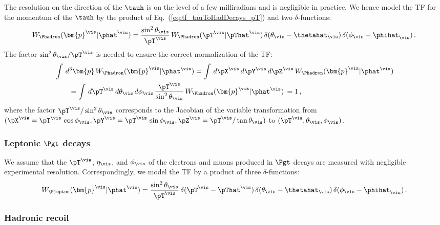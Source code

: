 The resolution on the direction of the $\tauh$ is on the level
of a few milliradians and is negligible in practice.
We hence model the TF for the momentum of the $\tauh$ by the product of Eq.~(\ref{eq:tf_tauToHadDecays_pT}) and two
$\delta$-functions:
\begin{equation}
W_{\Phadron}( \bm{p}^{\vis} | \phat^{\vis} ) =
 \frac{\sin^{2}\theta_{\vis}}{\pT^{\vis}} \, 
  W_{\Phadron}( \pT^{\vis} | \pThat^{\vis} ) \,
  \delta( \theta_{\vis} - \thetahat_{\vis} ) \, 
  \delta( \phi_{\vis} - \phihat_{\vis} ) \, .
\label{eq:tf_tauToHadDecays}
\end{equation}
The factor $\sin^{2}\theta_{\vis}/\pT^{\vis}$ is needed
to ensure the correct normalization of the TF:
\begin{align}
& \int \, d^{3}\bm{p}  \, W_{\Phadron}( \bm{p}^{\vis} | \phat^{\vis} ) = \int \, d\pX^{\vis} \, d\pY^{\vis} \, d\pZ^{\vis} \, W_{\Phadron}( \bm{p}^{\vis} | \phat^{\vis} ) \nonumber \\
& \qquad = \int \, d\pT^{\vis} \, d\theta_{\vis} \, d\phi_{\vis} \,
\frac{\pT^{\vis}}{\sin^{2} \theta_{\vis}} \, W_{\Phadron}( \bm{p}^{\vis} | \phat^{\vis} ) \, 
  = 1 \, ,
\end{align}
where the factor $\pT^{\vis}/\sin^{2} \theta_{\vis}$ corresponds to the Jacobian of the variable transformation 
from $(\pX^{\vis} = \pT^{\vis} \, \cos\phi_{\vis}, \pY^{\vis} = \pT^{\vis} \, \sin\phi_{\vis}, \pZ^{\vis} = \pT^{\vis}/\tan\theta_{\vis})$ 
to $(\pT^{\vis}, \theta_{\vis}, \phi_{\vis})$.


\subsubsection{Leptonic $\Pgt$ decays}
\label{sec:mem_TF_tauToLepDecays}

We assume that the $\pT^{\vis}$, $\eta_{\vis}$, and $\phi_{\vis}$
of the electrons and muons produced in $\Pgt$ decays are measured with negligible experimental resolution.
Correspondingly, we model the TF by a product of three $\delta$-functions:
\begin{equation}
W_{\Plepton}( \bm{p}^{\vis} | \phat^{\vis} ) =  
 \frac{\sin^{2} \theta_{\vis}}{\pT^{\vis}} \, 
  \delta( \pT^{\vis} - \pThat^{\vis} ) \, 
  \delta( \theta_{\vis} - \thetahat_{\vis} ) \, 
  \delta( \phi_{\vis} - \phihat_{\vis} ) \, .
\label{eq:tf_tauToLepDecays}
\end{equation}


\subsubsection{Hadronic recoil}
\label{sec:mem_TF_hadRecoil}

